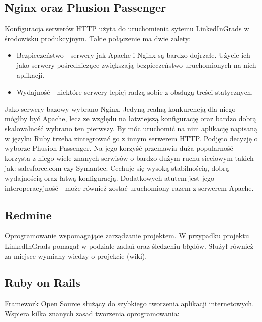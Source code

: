 \subsection{Nginx oraz Phusion Passenger}

Konfiguracja serwerów HTTP użyta do uruchomienia sytemu LinkedInGrads w środowisku produkcyjnym. Takie połączenie ma dwie zalety:

\begin{itemize}
\item Bezpieczeństwo - serwery jak Apache i Nginx są bardzo dojrzałe. Użycie ich jako serwery pośredniczące zwiększają bezpieczeństwo uruchomionych na nich aplikacji.
\item Wydajność - niektóre serwery lepiej radzą sobie z obsługą treści statycznych.
\end{itemize}

Jako serwery bazowy wybrano Nginx. Jedyną realną konkurencją dla niego mógłby być Apache, lecz ze względu na łatwiejszą konfigurację oraz bardzo dobrą skalowalność wybrano ten pierwszy. By móc uruchomić na nim aplikację napisaną w języku Ruby trzeba zintegrować go z innym serwerem HTTP. Podjęto decyzję o wyborze Phusion Passenger. Na jego korzyść przemawia duża popularność - korzysta z niego wiele znanych serwisów o bardzo dużym ruchu sieciowym takich jak: salesforce.com czy Symantec. Cechuje się wysoką stabilnością, dobrą wydajnością oraz łatwą konfiguracją. Dodatkowych atutem jest jego interoperacyjność - może również zostać uruchomiony razem z serwerem Apache.

\subsection{Redmine}

Oprogramowanie wspomagające zarządzanie projektem. W przypadku projektu LinkedInGrads pomagał w podziale zadań oraz śledzeniu błędów. Służył również za miejsce wymiany wiedzy o projekcie (wiki).

\subsection{Ruby on Rails}

Framework Open Source służący do szybkiego tworzenia aplikacji internetowych. Wspiera kilka znanych zasad tworzenia oprogramowania:

